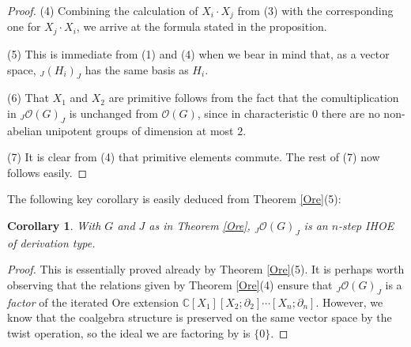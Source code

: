 \documentclass{amsart}
\numberwithin{equation}{section}
\newtheorem{corollary}[theorem]{Corollary}
\theoremstyle{definition}
\begin{document}
\begin{proof}
(4) Combining the calculation of $X_i \cdot X_j$ from (3) with the corresponding one for $X_j \cdot X_i$, we arrive at the formula stated in the proposition.

(5) This is immediate from (1) and (4) when we bear in mind that, as a vector space, ${}_J(H_i)_J$ has the same basis as $H_i$.

(6) That $X_1$ and $X_2$ are primitive follows from the fact that the comultiplication in ${}_J\mathcal{O}(G)_J$ is unchanged from $\mathcal{O}(G)$, since in characteristic $0$ there are no non-abelian unipotent groups of dimension at most $2$.

(7) It is clear from (4) that primitive elements commute. The rest of (7) now follows easily. 
\end{proof}

The following key corollary is easily deduced from Theorem \ref{Ore}(5):

\begin{corollary}\label{nIHOE} With $G$ and $J$ as in Theorem \ref{Ore}, ${}_J\mathcal{O}(G)_J$ is an $n$-step IHOE of derivation type.
\end{corollary}
\begin{proof} This is essentially proved already by Theorem \ref{Ore}(5). It is perhaps worth observing that the relations given by Theorem \ref{Ore}(4) ensure that ${}_J\mathcal{O}(G)_J$ is a \emph{factor} of the iterated Ore extension $\mathbb{C}[X_1][X_2; \partial_2] \cdots [X_n ; \partial_n]$. However, we know that the coalgebra structure is preserved on the same vector space by the twist operation, so the ideal we are factoring by is $\{0\}$.
\end{proof}
\end{document}
